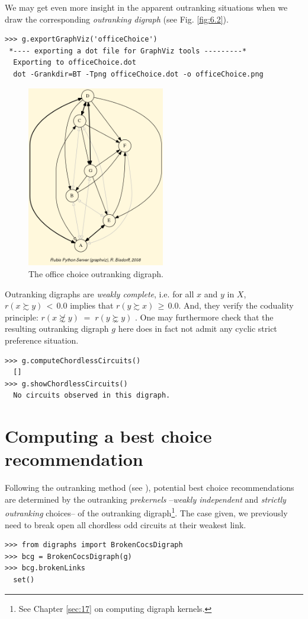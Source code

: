 We may get even more insight in the apparent outranking situations when we draw the corresponding \emph{outranking digraph} (see Fig. \ref{fig:6.2}).
\begin{lstlisting}
>>> g.exportGraphViz('officeChoice')
 *---- exporting a dot file for GraphViz tools ---------*
  Exporting to officeChoice.dot
  dot -Grankdir=BT -Tpng officeChoice.dot -o officeChoice.png
\end{lstlisting}
\begin{figure}[h]
\sidecaption
\includegraphics[width=6cm]{Figures/officeChoice.png}
\caption{The office choice outranking digraph.}
\label{fig:6.3}       %
\end{figure}

Outranking digraphs are \emph{weakly complete}, i.e. for all $x$ and $y$ in $X$, $r(x \succsim y)\, <\, 0.0$ implies that $r(y \succsim x)\, \geq\, 0.0$. And, they verify the coduality principle:  $r(x \not\succsim y) \;=\; r(y \succnsim y)$ \citep{BIS-2013}. One may furthermore check that the resulting outranking digraph $g$ here does in fact not admit any cyclic strict preference situation.
\begin{lstlisting}
>>> g.computeChordlessCircuits()
  []
>>> g.showChordlessCircuits()
  No circuits observed in this digraph.
\end{lstlisting}

\section{Computing a \Rubis best choice recommendation}
\label{sec:6.3}

Following the \Rubis outranking method (see \citet{BIS-2008a}), potential best choice recommendations are determined by the outranking \emph{prekernels} --\emph{weakly independent} and \emph{strictly outranking} choices-- of the outranking digraph\footnote{See Chapter \ref{sec:17} on computing digraph kernels.}. The case given, we previously need to break open all chordless odd circuits at their weakest link.
\begin{lstlisting}
>>> from digraphs import BrokenCocsDigraph
>>> bcg = BrokenCocsDigraph(g)
>>> bcg.brokenLinks
  set()
\end{lstlisting}

